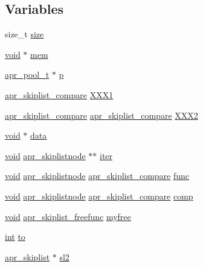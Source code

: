 \subsection*{Variables}
\begin{DoxyCompactItemize}
\item 
size\+\_\+t \hyperlink{group__apr__skiplist_ga854352f53b148adc24983a58a1866d66}{size}
\item 
\hyperlink{group__MOD__ISAPI_gacd6cdbf73df3d9eed42fa493d9b621a6}{void} $\ast$ \hyperlink{group__apr__skiplist_ga5f00e9b1b039412bb144bae39e66b97a}{mem}
\item 
\hyperlink{structapr__pool__t}{apr\+\_\+pool\+\_\+t} $\ast$ \hyperlink{group__apr__skiplist_ga2e727f881424334cf12d8af10f50ec6c}{p}
\item 
\hyperlink{group__apr__skiplist_ga873aa114e692e48c6587277680ceba87}{apr\+\_\+skiplist\+\_\+compare} \hyperlink{group__apr__skiplist_gad042c7a41c89fa092e07fdcf4c2083a8}{X\+X\+X1}
\item 
\hyperlink{group__apr__skiplist_ga873aa114e692e48c6587277680ceba87}{apr\+\_\+skiplist\+\_\+compare} \hyperlink{group__apr__skiplist_ga873aa114e692e48c6587277680ceba87}{apr\+\_\+skiplist\+\_\+compare} \hyperlink{group__apr__skiplist_ga84bc4669552c5f36056a2cc3dbbb8a5e}{X\+X\+X2}
\item 
\hyperlink{group__MOD__ISAPI_gacd6cdbf73df3d9eed42fa493d9b621a6}{void} $\ast$ \hyperlink{group__apr__skiplist_ga735984d41155bc1032e09bece8f8d66d}{data}
\item 
\hyperlink{group__MOD__ISAPI_gacd6cdbf73df3d9eed42fa493d9b621a6}{void} \hyperlink{structapr__skiplistnode}{apr\+\_\+skiplistnode} $\ast$$\ast$ \hyperlink{group__apr__skiplist_ga10f599e54ccc9c523778ae9fa3768fa7}{iter}
\item 
\hyperlink{group__MOD__ISAPI_gacd6cdbf73df3d9eed42fa493d9b621a6}{void} \hyperlink{structapr__skiplistnode}{apr\+\_\+skiplistnode} \hyperlink{group__apr__skiplist_ga873aa114e692e48c6587277680ceba87}{apr\+\_\+skiplist\+\_\+compare} \hyperlink{group__apr__skiplist_gaee53a4f82df38673698370da70c2867b}{func}
\item 
\hyperlink{group__MOD__ISAPI_gacd6cdbf73df3d9eed42fa493d9b621a6}{void} \hyperlink{structapr__skiplistnode}{apr\+\_\+skiplistnode} \hyperlink{group__apr__skiplist_ga873aa114e692e48c6587277680ceba87}{apr\+\_\+skiplist\+\_\+compare} \hyperlink{group__apr__skiplist_ga4c81b1eebdb8efeefcadd27cb3fe1c31}{comp}
\item 
\hyperlink{group__MOD__ISAPI_gacd6cdbf73df3d9eed42fa493d9b621a6}{void} \hyperlink{group__apr__skiplist_ga326fdccaf516e5296969fa03bbda3fca}{apr\+\_\+skiplist\+\_\+freefunc} \hyperlink{group__apr__skiplist_gaa59952b672ce1b07cfc02c249530ec82}{myfree}
\item 
\hyperlink{pcre_8txt_a42dfa4ff673c82d8efe7144098fbc198}{int} \hyperlink{group__apr__skiplist_gac0ed249f3db34b8135fd2717bda56844}{to}
\item 
\hyperlink{structapr__skiplist}{apr\+\_\+skiplist} $\ast$ \hyperlink{group__apr__skiplist_ga4d8baea9b8ea8ce7d5261f87393d1b46}{sl2}
\end{DoxyCompactItemize}


